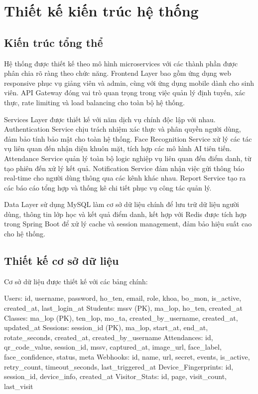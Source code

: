 \documentclass[12pt,a4paper]{report}
\begin{document}
\section{Thiết kế kiến trúc hệ thống}
\subsection{Kiến trúc tổng thể}
Hệ thống được thiết kế theo mô hình microservices với các thành phần được phân chia rõ ràng theo chức năng. Frontend Layer bao gồm ứng dụng web responsive phục vụ giảng viên và admin, cùng với ứng dụng mobile dành cho sinh viên. API Gateway đóng vai trò quan trọng trong việc quản lý định tuyến, xác thực, rate limiting và load balancing cho toàn bộ hệ thống.

Services Layer được thiết kế với năm dịch vụ chính độc lập với nhau. Authentication Service chịu trách nhiệm xác thực và phân quyền người dùng, đảm bảo tính bảo mật cho toàn hệ thống. Face Recognition Service xử lý các tác vụ liên quan đến nhận diện khuôn mặt, tích hợp các mô hình AI tiên tiến. Attendance Service quản lý toàn bộ logic nghiệp vụ liên quan đến điểm danh, từ tạo phiên đến xử lý kết quả. Notification Service đảm nhận việc gửi thông báo real-time cho người dùng thông qua các kênh khác nhau. Report Service tạo ra các báo cáo tổng hợp và thống kê chi tiết phục vụ công tác quản lý.

Data Layer sử dụng MySQL làm cơ sở dữ liệu chính để lưu trữ dữ liệu người dùng, thông tin lớp học và kết quả điểm danh, kết hợp với Redis được tích hợp trong Spring Boot để xử lý cache và session management, đảm bảo hiệu suất cao cho hệ thống.

\subsection{Thiết kế cơ sở dữ liệu}
Cơ sở dữ liệu được thiết kế với các bảng chính:

Users: id, username, password, ho_ten, email, role, khoa, bo_mon, is_active, created_at, last_login_at
Students: mssv (PK), ma_lop, ho_ten, created_at
Classes: ma_lop (PK), ten_lop, mo_ta, created_by_username, created_at, updated_at
Sessions: session_id (PK), ma_lop, start_at, end_at, rotate_seconds, created_at, created_by_username
Attendances: id, qr_code_value, session_id, mssv, captured_at, image_url, face_label, face_confidence, status, meta
Webhooks: id, name, url, secret, events, is_active, retry_count, timeout_seconds, last_triggered_at
Device_Fingerprints: id, session_id, device_info, created_at
Visitor_Stats: id, page, visit_count, last_visit
\end{document}
